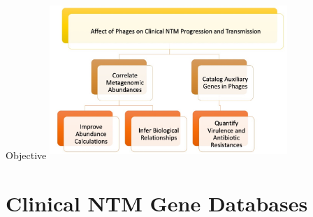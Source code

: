\documentclass[11pt, xcolor=table]{beamer}
\begin{document}
	\begin{frame}{Objective}
	\center
	\includegraphics[height=6cm, width=9cm]{objective.jpg}
	
	\end{frame}

	
\section{Clinical NTM Gene Databases}
\end{document}
